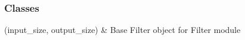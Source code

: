 \documentclass[letterpaper,10pt,english]{sphinxmanual}
\begin{document}
\subsubsection*{Classes}


\begin{savenotes}\sphinxattablestart
\sphinxthistablewithglobalstyle
\sphinxthistablewithnovlinesstyle
\centering
\begin{tabulary}{\linewidth}[t]{}
\sphinxtoprule
\sphinxtableatstartofbodyhook
\sphinxAtStartPar
{\hyperref[\detokenize{generated/eflatun_uav.filters:eflatun_uav.filters.BaseFilter}]{}}(input\_size, output\_size)
&
\sphinxAtStartPar
Base Filter object for Filter module
\\
\sphinxbottomrule
\end{tabulary}
\sphinxtableafterendhook\par
\sphinxattableend\end{savenotes}
\end{document}
